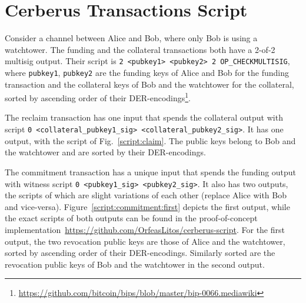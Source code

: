 \documentclass[runningheads]{llncs}
\begin{document}
\section{Cerberus Transactions Script}
\label{sec:script}

Consider a channel between Alice and Bob, where only Bob is using a watchtower.
The funding and the collateral transactions both have a 2-of-2 multisig output. Their script is
\texttt{2 <pubkey1> <pubkey2> 2 OP\_CHECKMULTISIG},
where \texttt{pubkey1}, \texttt{pubkey2} are the funding keys of Alice and Bob for the funding transaction and the collateral keys of Bob and the watchtower for the collateral, sorted by ascending order of their DER-encodings\footnote{\url{https://github.com/bitcoin/bips/blob/master/bip-0066.mediawiki}}.

The reclaim transaction has one input that spends the collateral output with script
\texttt{0 <collateral\_pubkey1\_sig> <collateral\_pubkey2\_sig>}.
It has one output, with the script of Fig.~\ref{script:claim}. The public keys belong to Bob and the watchtower and are sorted by their DER-encodings.


The commitment transaction has a unique input that spends the funding output with witness script \texttt{0 <pubkey1\_sig> <pubkey2\_sig>}. It also has two outputs, the scripts of which are slight variations of each other (replace Alice with Bob and vice-versa). Figure~\ref{script:commitment:first} depicts the first output, while
the exact scripts of both outputs can be found in the proof-of-concept implementation~\url{https://github.com/OrfeasLitos/cerberus-script}.
For the first output, the two revocation public keys are those of Alice and the watchtower, sorted by ascending order of their DER-encodings. Similarly sorted are the revocation public keys of Bob and the watchtower in the second output.
\end{document}

